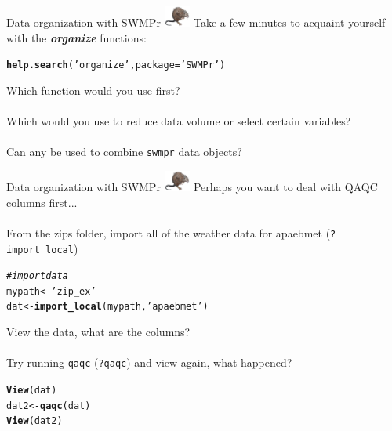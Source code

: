 \documentclass[xcolor=dvipsnames]{beamer}\usepackage[]{graphicx}\usepackage[]{color}
\makeatletter
\newcommand{\hlstr}[1]{\textcolor[rgb]{0.192,0.494,0.8}{#1}}%
\newcommand{\hlcom}[1]{\textcolor[rgb]{0.678,0.584,0.686}{\textit{#1}}}%
\newcommand{\hlstd}[1]{\textcolor[rgb]{0.345,0.345,0.345}{#1}}%
\newcommand{\hlkwb}[1]{\textcolor[rgb]{0.69,0.353,0.396}{#1}}%
\newcommand{\hlkwc}[1]{\textcolor[rgb]{0.333,0.667,0.333}{#1}}%
\newcommand{\hlkwd}[1]{\textcolor[rgb]{0.737,0.353,0.396}{\textbf{#1}}}%
\newenvironment{kframe}{%
 \def\at@end@of@kframe{}%
 \ifinner\ifhmode%
  \def\at@end@of@kframe{\end{minipage}}%
  \begin{minipage}{\columnwidth}%
 \fi\fi%
 \def\FrameCommand##1{\hskip\@totalleftmargin \hskip-\fboxsep
 \colorbox{shadecolor}{##1}\hskip-\fboxsep
     \hskip-\linewidth \hskip-\@totalleftmargin \hskip\columnwidth}%
 \MakeFramed {\advance\hsize-\width
   \@totalleftmargin\z@ \linewidth\hsize
   \@setminipage}}%
 {\par\unskip\endMakeFramed%
 \at@end@of@kframe}
\newenvironment{knitrout}{}{} %
\newcommand{\Bigtxt}[1]{\textbf{\textit{#1}}}
\makeatother
\begin{document}
\begin{frame}[fragile]{Data organization with SWMPr \includegraphics[width = 0.065\textwidth]{imgs/swmprat.png}}
\onslide<+->
Take a few minutes to acquaint yourself with the \Bigtxt{organize} functions:
\begin{knitrout}\scriptsize
{}\color{fgcolor}\begin{kframe}
\begin{alltt}
\hlkwd{help.search}\hlstd{(}\hlstr{'organize'}\hlstd{,} \hlkwc{package} \hlstd{=} \hlstr{'SWMPr'}\hlstd{)}
\end{alltt}
\end{kframe}
\end{knitrout}
\onslide<+->
Which function would you use first? \\~\\
Which would you use to reduce data volume or select certain variables? \\~\\
Can any be used to combine \texttt{swmpr} data objects? 
\end{frame}

\begin{frame}[fragile]{Data organization with SWMPr \includegraphics[width = 0.065\textwidth]{imgs/swmprat.png}}
\onslide<+->
Perhaps you want to deal with QAQC columns first... \\~\\
From the zips folder, import all of the weather data for apaebmet (\texttt{?import\_local})
\onslide<+->
\begin{knitrout}\scriptsize
{}\color{fgcolor}\begin{kframe}
\begin{alltt}
\hlcom{# import data }
\hlstd{mypath} \hlkwb{<-} \hlstr{'zip_ex'}
\hlstd{dat} \hlkwb{<-} \hlkwd{import_local}\hlstd{(mypath,} \hlstr{'apaebmet'}\hlstd{)}
\end{alltt}
\end{kframe}
\end{knitrout}
\onslide<+->
View the data, what are the columns? \\~\\
Try running \texttt{qaqc} (\texttt{?qaqc}) and view again, what happened?
\onslide<+->
\begin{knitrout}\scriptsize
{}\color{fgcolor}\begin{kframe}
\begin{alltt}
\hlkwd{View}\hlstd{(dat)}
\hlstd{dat2} \hlkwb{<-} \hlkwd{qaqc}\hlstd{(dat)}
\hlkwd{View}\hlstd{(dat2)}
\end{alltt}
\end{kframe}
\end{knitrout}
\end{frame}
\end{document}
